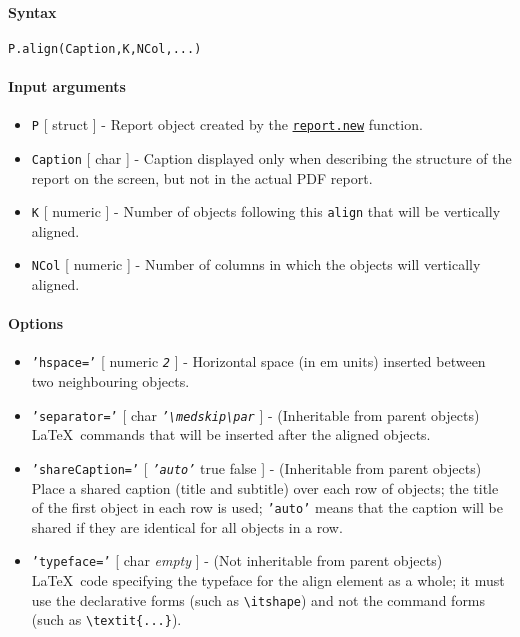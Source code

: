 


	\paragraph{Syntax}\label{syntax}

\begin{verbatim}
P.align(Caption,K,NCol,...)
\end{verbatim}

\paragraph{Input arguments}\label{input-arguments}

\begin{itemize}
\item
  \texttt{P} {[} struct {]} - Report object created by the
  \href{report/new}{\texttt{report.new}} function.
\item
  \texttt{Caption} {[} char {]} - Caption displayed only when describing
  the structure of the report on the screen, but not in the actual PDF
  report.
\item
  \texttt{K} {[} numeric {]} - Number of objects following this
  \texttt{align} that will be vertically aligned.
\item
  \texttt{NCol} {[} numeric {]} - Number of columns in which the objects
  will vertically aligned.
\end{itemize}

\paragraph{Options}\label{options}

\begin{itemize}
\item
  \texttt{'hspace='} {[} numeric \textbar{} \emph{\texttt{2}} {]} -
  Horizontal space (in em units) inserted between two neighbouring
  objects.
\item
  \texttt{'separator='} {[} char \textbar{}
  \emph{\texttt{'\textbackslash{}medskip\textbackslash{}par}} {]} -
  (Inheritable from parent objects) \LaTeX~commands that will be
  inserted after the aligned objects.
\item
  \texttt{'shareCaption='} {[} \emph{\texttt{'auto'}} \textbar{} true
  \textbar{} false {]} - (Inheritable from parent objects) Place a
  shared caption (title and subtitle) over each row of objects; the
  title of the first object in each row is used; \texttt{'auto'} means
  that the caption will be shared if they are identical for all objects
  in a row.
\item
  \texttt{'typeface='} {[} char \textbar{} \emph{empty} {]} - (Not
  inheritable from parent objects) \LaTeX~code specifying the typeface
  for the align element as a whole; it must use the declarative forms
  (such as \texttt{\textbackslash{}itshape}) and not the command forms
  (such as \texttt{\textbackslash{}textit\{...\}}).
\end{itemize}

